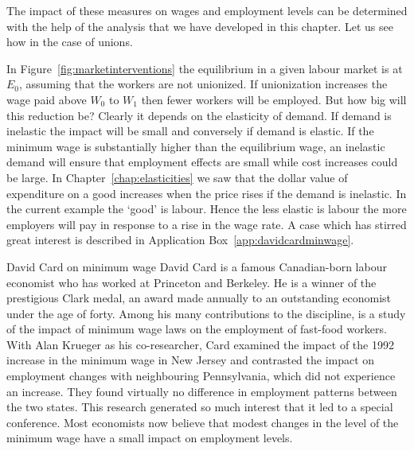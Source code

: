 The impact of these measures on wages and employment levels can be determined with the help of the analysis that we have developed in this chapter. Let us see how in the case of unions.

In Figure~\ref{fig:marketinterventions} the equilibrium in a given labour market is at $E_0$, assuming that the workers are not unionized. If unionization increases the wage paid above $W_0$ to $W_1$ then fewer workers will be employed. But how big will this reduction be?  Clearly it depends on the elasticity of demand. If demand is inelastic the impact will be small and conversely if demand is elastic. If the minimum wage is substantially higher than the equilibrium wage, an inelastic demand will ensure that employment effects are small while cost increases could be large. In Chapter~\ref{chap:elasticities} we saw that the dollar value of expenditure on a good increases when the price rises if the demand is inelastic. In the current example the `good' is labour. Hence the less elastic is labour the more employers will pay in response to a rise in the wage rate. A case which has stirred great interest is described in Application Box~\ref{app:davidcardminwage}.



\begin{ApplicationBox}{David Card on minimum wage \label{app:davidcardminwage}}
David Card is a famous Canadian-born labour economist who has worked at Princeton and Berkeley. He is a winner of the prestigious Clark medal, an award made annually to an outstanding economist under the age of forty. Among his many contributions to the discipline, is a study of the impact of minimum wage laws on the employment of fast-food workers. With Alan Krueger as his co-researcher, Card examined the impact of the 1992 increase in the minimum wage in New Jersey and contrasted the impact on employment changes with neighbouring Pennsylvania, which did not experience an increase. They found virtually no difference in employment patterns between the two states. This research generated so much interest that it led to a special conference. Most economists now believe that modest changes in the level of the minimum wage have a small impact on employment levels.
\end{ApplicationBox}